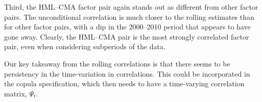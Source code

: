 Third, the HML--CMA factor pair again stands out as different from other factor pairs. The unconditional correlation is much closer to the rolling estimates than for other factor pairs, with a dip in the 2000--2010 period that appears to have gone away. Clearly, the HML--CMA pair is the most strongly correlated factor pair, even when considering subperiods of the data.

Our key takeaway from the rolling correlations is that there seems to be persistency in the time-variation in correlations. This could be incorporated in the copula specification, which then needs to have a time-varying correlation matrix, $\Psi_t$.




\label{sub:threshold_and_rolling_correlations_of_residuals}

